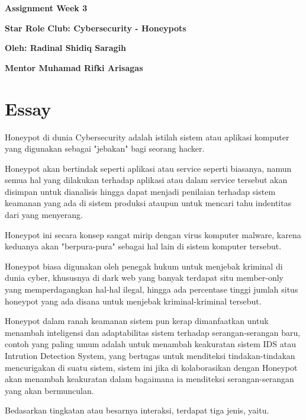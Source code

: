 \documentclass[12pt, a4paper]{article}
\date{}
\begin{document}
  \begin{flushleft}

    \textbf{Assignment Week 3}
    \linebreak

    \textbf{Star Role Club: Cybersecurity - Honeypots}
    \linebreak

    \textbf{Oleh: Radinal Shidiq Saragih}

    \textbf{Mentor Muhamad Rifki Arisagas}

  \end{flushleft}

  \section*{Essay}

    Honeypot di dunia Cybersecurity adalah istilah sistem atau aplikasi komputer
    yang digunakan sebagai "jebakan" bagi seorang hacker.

    Honeypot akan bertindak seperti aplikasi atau service seperti biasanya,
    namun semua hal yang dilakukan terhadap aplikasi atau dalam service tersebut
    akan disimpan untuk dianalisis hingga dapat menjadi penilaian terhadap sistem
    keamanan yang ada di sistem produksi ataupun untuk mencari tahu indentitas
    dari yang menyerang.

    Honeypot ini secara konsep sangat mirip dengan virus komputer malware, karena
    keduanya akan "berpura-pura" sebagai hal lain di sistem komputer tersebut.

    Honeypot biasa digunakan oleh penegak hukum untuk menjebak kriminal di dunia
    cyber, khususnya di dark web yang banyak terdapat situ member-only yang memperdagangkan
    hal-hal ilegal, hingga ada percentase tinggi jumlah situs honeypot yang ada disana
    untuk menjebak kriminal-kriminal tersebut.

    Honeypot dalam ranah keamanan sistem pun kerap dimanfaatkan untuk menambah
    inteligensi dan adaptabilitas sistem terhadap serangan-serangan baru, contoh yang
    paling umum adalah untuk menambah keakuratan sistem IDS atau Intrution Detection
    System, yang bertugas untuk menditeksi tindakan-tindakan mencurigakan di suatu
    sistem, sistem ini jika di kolaborasikan dengan Honeypot akan menambah keakuratan dalam
    bagaimana ia menditeksi serangan-serangan yang akan bermunculan.

    Bedasarkan tingkatan atau besarnya interaksi, terdapat tiga jenis, yaitu.
\end{document}
